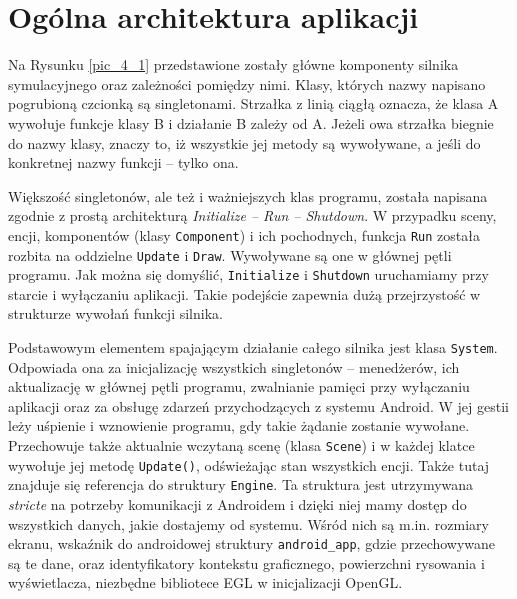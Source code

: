 	\section{Ogólna architektura aplikacji}
	\label{t:praktyka:ogolne}
	
	
	
	Na Rysunku \ref{pic_4_1} przedstawione zostały główne komponenty silnika symulacyjnego oraz zależności pomiędzy nimi. Klasy, których nazwy napisano pogrubioną czcionką są singletonami. Strzałka z linią ciągłą oznacza, że klasa A wywołuje funkcje klasy B i działanie B zależy od A. Jeżeli owa strzałka biegnie do nazwy klasy, znaczy to, iż wszystkie jej metody są wywoływane, a jeśli do konkretnej nazwy funkcji -- tylko ona.
	
	Większość singletonów, ale też i ważniejszych klas programu, została napisana zgodnie z prostą architekturą \emph{Initialize -- Run -- Shutdown}. W przypadku sceny, encji, komponentów (klasy \texttt{Component}) i ich pochodnych, funkcja \texttt{Run} została rozbita na oddzielne \texttt{Update} i \texttt{Draw}. Wywoływane są one w głównej pętli programu. Jak można się domyślić, \texttt{Initialize} i \texttt{Shutdown} uruchamiamy przy starcie i wyłączaniu aplikacji. Takie podejście zapewnia dużą przejrzystość w strukturze wywołań funkcji silnika.
	
	Podstawowym elementem spajającym działanie całego silnika jest klasa \texttt{System}. Odpowiada ona za inicjalizację wszystkich singletonów -- menedżerów, ich aktualizację w głównej pętli programu, zwalnianie pamięci przy wyłączaniu aplikacji oraz za obsługę zdarzeń przychodzących z systemu Android. W jej gestii leży uśpienie i wznowienie programu, gdy takie żądanie zostanie wywołane. Przechowuje także aktualnie wczytaną scenę (klasa \texttt{Scene}) i w każdej klatce wywołuje jej metodę \texttt{Update()}, odświeżając stan wszystkich encji. Także tutaj znajduje się referencja do struktury \texttt{Engine}. Ta struktura jest utrzymywana \emph{stricte} na potrzeby komunikacji z Androidem i dzięki niej mamy dostęp do wszystkich danych, jakie dostajemy od systemu. Wśród nich są m.in. rozmiary ekranu, wskaźnik do androidowej struktury \texttt{android\_app}, gdzie przechowywane są te dane, oraz identyfikatory kontekstu graficznego, powierzchni rysowania i wyświetlacza, niezbędne bibliotece EGL w inicjalizacji OpenGL.
	
